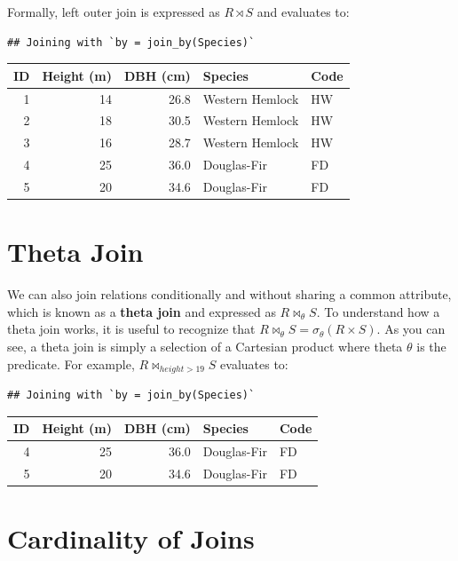 \documentclass[
]{book}
\begin{document}
Formally, left outer join is expressed as \(R⋊S\) and evaluates to:

\begin{verbatim}
## Joining with `by = join_by(Species)`
\end{verbatim}

\begin{tabular}{rrrll}
\toprule
ID & Height (m) & DBH (cm) & Species & Code\\
\midrule
1 & 14 & 26.8 & Western Hemlock & HW\\
2 & 18 & 30.5 & Western Hemlock & HW\\
3 & 16 & 28.7 & Western Hemlock & HW\\
4 & 25 & 36.0 & Douglas-Fir & FD\\
5 & 20 & 34.6 & Douglas-Fir & FD\\
\bottomrule
\end{tabular}

\hypertarget{theta-join}{%
\section{Theta Join}\label{theta-join}}

We can also join relations conditionally and without sharing a common attribute, which is known as a \textbf{theta join} and expressed as \(R⋈_θS\). To understand how a theta join works, it is useful to recognize that \(R⋈_θS=σ_{θ}(R×S)\). As you can see, a theta join is simply a selection of a Cartesian product where theta \(θ\) is the predicate. For example, \(R⋈_{height>19}S\) evaluates to:

\begin{verbatim}
## Joining with `by = join_by(Species)`
\end{verbatim}

\begin{tabular}{rrrll}
\toprule
ID & Height (m) & DBH (cm) & Species & Code\\
\midrule
4 & 25 & 36.0 & Douglas-Fir & FD\\
5 & 20 & 34.6 & Douglas-Fir & FD\\
\bottomrule
\end{tabular}

\hypertarget{cardinality-of-joins}{%
\section{Cardinality of Joins}\label{cardinality-of-joins}}
\end{document}
